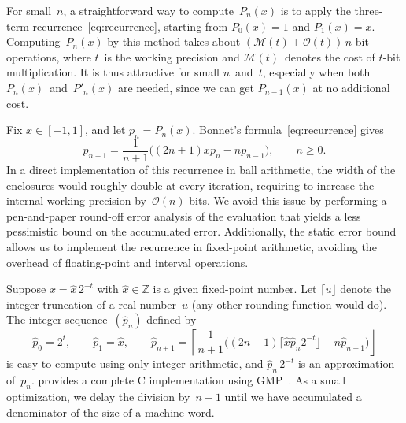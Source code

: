 \documentclass[nohypdvips,review]{siamart0216}
\newcommand{\OO}{\mathcal{O}}
\newcommand{\MM}{\mathcal{M}}
\begin{document}
\label{sec:recurrence}

For small $n$, a straightforward way to compute~$P_n(x)$ is to apply
the three-term recurrence \cref{eq:recurrence},
starting from $P_0(x)=1$ and ${P_1(x) = x}$.
Computing~$P_n(x)$ by this method takes about $(\MM(t) + \OO(t))\, n$
bit operations, where $t$ is the working precision and $\MM(t)$ denotes the
cost of $t$-bit multiplication.
It is thus attractive for small $n$ and $t$, especially when both
$P_n(x)$ and $P'_n(x)$ are needed, since we can get $P_{n-1}(x)$ at no
additional cost.

Fix $x \in [-1, 1]$, and let $p_n = P_n(x)$.
Bonnet's formula~\cref{eq:recurrence} gives
\begin{equation} \label{eq:rec-bis}
  p_{n + 1} =
    \frac{1}{n+1}
    \bigl( (2n +1) x p_n - n p_{n-1} \bigr),
  \qquad n \geq 0.
\end{equation}
In a direct implementation of this recurrence in ball arithmetic, the
width of the enclosures would roughly double at every iteration,
requiring to increase the internal working precision by $\OO(n)$ bits.
We avoid this issue by performing a pen-and-paper round-off error
analysis of the evaluation that yields a less pessimistic bound on the
accumulated error.
Additionally, the static error bound allows us to implement the
recurrence in fixed-point arithmetic, avoiding the overhead of
floating-point and interval operations.

Suppose $x = \hat x \, 2^{-t}$ with $\hat x \in \mathbb Z$
is a given fixed-point number.
Let $\lceil u \rfloor$ denote the integer truncation of a real
number~$u$ (any other rounding function would do).
The integer sequence $(\hat p_n)$ defined by
\begin{equation} \label{eq:rec-fxpt}
  \hat{p}_0 = 2^t, \qquad
  \hat{p}_1 = \hat x, \qquad
  \hat{p}_{n + 1} =
    \left\lceil \frac{1}{n + 1}  \bigl( (2 n + 1) \lceil \hat{x}
      \hat{p}_n 2^{- t} \rfloor - n \hat{p}_{n - 1} \bigr)
    \right\rfloor
\end{equation}
is easy to compute using only integer arithmetic, and
$\hat p_n \, 2^{-t}$ is an approximation of~$p_n$.
 provides a complete C implementation
using GMP~\cite{granlund2017}.
As a small optimization, we delay the division by~$n+1$ until we have
accumulated a denominator of the size of a machine word.
\end{document}
